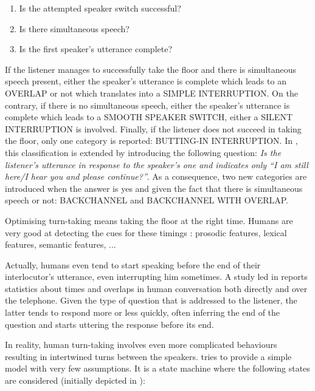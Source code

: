         \begin{enumerate}
            \item Is the attempted speaker switch successful?
            \item Is there simultaneous speech?
            \item Is the first speaker's utterance complete?
        \end{enumerate}
        
        If the listener manages to successfully take the floor and there is simultaneous speech present, either the speaker's utterance is complete which leads to an OVERLAP or not which translates into a SIMPLE INTERRUPTION. On the contrary, if there is no simultaneous speech, either the speaker's utterance is complete which leads to a SMOOTH SPEAKER SWITCH, either a SILENT INTERRUPTION is involved. Finally, if the listener does not succeed in taking the floor, only one category is reported: BUTTING-IN INTERRUPTION. In \cite{Gravano2011}, this classification is extended by introducing the following question: \textit{Is the listener's utterance in response to the speaker's one and indicates only ``I am still here/I hear you and please continue?''}. As a consequence, two new categories are introduced when the answer is yes and given the fact that there is simultaneous speech or not: BACKCHANNEL and BACKCHANNEL WITH OVERLAP.
        
        Optimising turn-taking means taking the floor at the right time. Humans are very good at detecting the cues for these timings \cite{Raux2008,Jonsdottir2008,Gravano2011}: prosodic features, lexical features, semantic features, ...

        Actually, humans even tend to start speaking before the end of their interlocutor's utterance, even interrupting him sometimes. A study led in \cite{Strombergsson2013} reports statistics about times and overlaps in human conversation both directly and over the telephone. Given the type of question that is addressed to the listener, the latter tends to respond more or less quickly, often inferring the end of the question and starts uttering the response before its end.
        
        In reality, human turn-taking involves even more complicated behaviours resulting in intertwined turns between the speakers. \citet{Raux2009} tries to provide a simple model with very few assumptions. It is a state machine where the following states are considered (initially depicted in \cite{Jaffe1970}):

